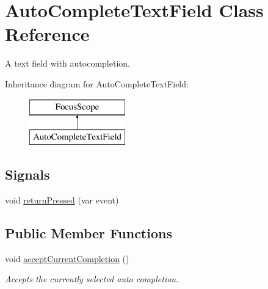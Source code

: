 \hypertarget{classAutoCompleteTextField}{\section{Auto\-Complete\-Text\-Field Class Reference}
\label{classAutoCompleteTextField}
}


A text field with autocompletion.  


Inheritance diagram for Auto\-Complete\-Text\-Field\-:\begin{figure}[H]
\begin{center}
\leavevmode
\includegraphics[height=2.000000cm]{classAutoCompleteTextField}
\end{center}
\end{figure}
\subsection*{Signals}
\begin{DoxyCompactItemize}
\item 
void \hyperlink{classAutoCompleteTextField_ac25877666f204e1262f089964c433868}{return\-Pressed} (var event)
\end{DoxyCompactItemize}
\subsection*{Public Member Functions}
\begin{DoxyCompactItemize}
\item 
\hypertarget{classAutoCompleteTextField_a5b1d8d7c0aec58bcaa9f556493d8dbda}{void \hyperlink{classAutoCompleteTextField_a5b1d8d7c0aec58bcaa9f556493d8dbda}{accept\-Current\-Completion} ()}\label{classAutoCompleteTextField_a5b1d8d7c0aec58bcaa9f556493d8dbda}

\begin{DoxyCompactList}\small\item\em Accepts the currently selected auto completion. \end{DoxyCompactList}\end{DoxyCompactItemize}
